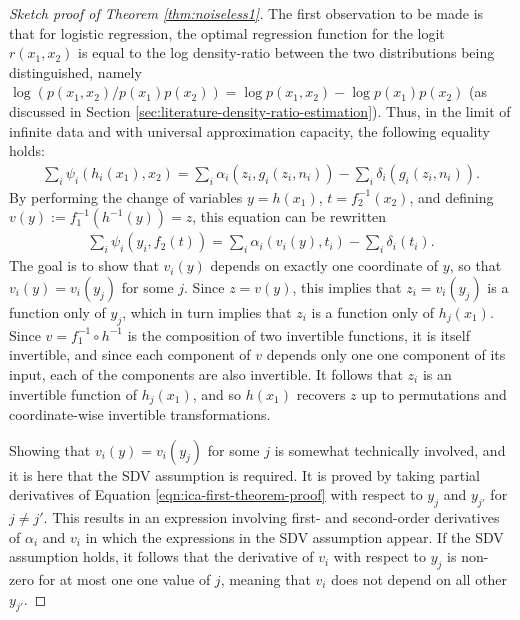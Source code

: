 \begin{proof}[Sketch proof of Theorem \ref{thm:noiseless1}]
The first observation to be made is that for logistic regression, the optimal regression function for the logit $r(x_1, x_2)$ is equal to the log density-ratio between the two distributions being distinguished, namely $\log\left( p(x_1, x_2) / p(x_1)p(x_2)\right) = \log p(x_1, x_2) - \log p(x_1)p(x_2)$ (as discussed in Section \ref{sec:literature-density-ratio-estimation}).
Thus, in the limit of infinite data and with universal approximation capacity, the following equality holds:
%
\begin{align*}
\sum_{i}\psi_{i}(h_{i}({x}_{1}),{x}_{2}) = \sum_i \alpha_i(z_i, g_i(z_i, n_i)) - \sum_i \delta_i(g_i(z_i, n_i)).
\end{align*}
%
By performing the change of variables $y=h(x_1)$, $t=f_2^{-1}(x_2)$, and defining $v(y) := f_1^{-1}(h^{-1}(y)) = z$, this equation can be rewritten
%
\begin{align}
\sum_{i}\psi_{i}(y_i,f_2(t)) = \sum_i \alpha_i(v_i(y), t_i) - \sum_i \delta_i(t_i). \label{eqn:ica-first-theorem-proof}
\end{align}
%
The goal is to show that $v_i(y)$ depends on exactly one coordinate of $y$, so that $v_i(y) = v_i(y_j)$ for some $j$. 
Since $z = v(y)$, this implies that $z_i = v_i(y_j)$ is a function only of $y_j$, which in turn implies that $z_i$ is a function only of $h_j(x_1)$. 
Since $v = f_1^{-1} \circ h^{-1}$ is the composition of two invertible functions, it is itself invertible, and since each component of $v$ depends only one one component of its input, each of the components are also invertible.
It follows that $z_i$ is an invertible function of $h_j(x_1)$, and so $h(x_1)$ recovers $z$ up to permutations and coordinate-wise invertible transformations.

Showing that $v_i(y) = v_i(y_j)$ for some $j$ is somewhat technically involved, and it is here that the SDV assumption is required.
It is proved by taking partial derivatives of Equation \ref{eqn:ica-first-theorem-proof} with respect to $y_j$ and $y_{j'}$ for $j\not=j'$. 
This results in an expression involving first- and second-order derivatives of $\alpha_i$ and $v_i$ in which the expressions in the SDV assumption appear. 
If the SDV assumption holds, it follows that the derivative of $v_i$ with respect to $y_j$ is non-zero for at most one one value of $j$, meaning that $v_i$ does not depend on all other $y_{j'}$. 
\end{proof}

